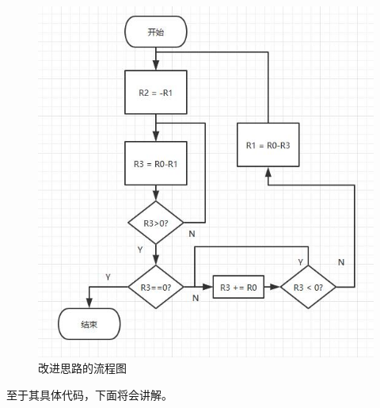 \documentclass[UTF8]{article}
\begin{document}
	\begin{figure}[H]
		\centering
		\includegraphics[width=0.6\linewidth]{process2.jpg}
		\caption{改进思路的流程图}
		\label{process2}
	\end{figure}\par
	至于其具体代码，下面将会讲解。\par
	
\end{document}
